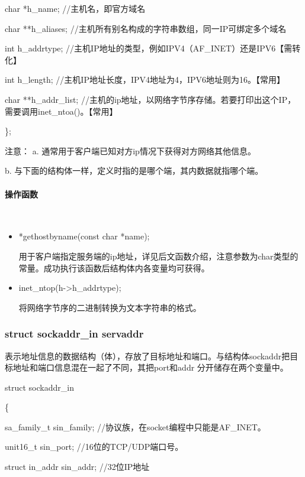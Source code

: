 \documentclass[UTF8]{article}%
\begin{document}
\qquad    char *h\_name;  //主机名，即官方域名
    
\qquad    char **h\_aliases;  //主机所有别名构成的字符串数组，同一IP可绑定多个域名

\qquad    int h\_addrtype; //主机IP地址的类型，例如IPV4（AF\_INET）还是IPV6【需转化】

\qquad    int h\_length;  //主机IP地址长度，IPV4地址为4，IPV6地址则为16。【常用】

\qquad    char **h\_addr\_list;  //主机的ip地址，以网络字节序存储。若要打印出这个IP，需要调用inet\_ntoa()。【常用】

\};

注意：
a. 通常用于客户端已知对方ip情况下获得对方网络其他信息。

b. 与下面的结构体一样，定义时指的是哪个端，其内数据就指哪个端。

\paragraph{操作函数}~{}


\begin{itemize}
    \item *gethostbyname(const char *name);
    
    用于客户端指定服务端的ip地址，详见后文函数介绍，注意参数为char类型的常量。成功执行该函数后结构体内各变量均可获得。

    \item inet\_ntop(h->h\_addrtype);
    
    将网络字节序的二进制转换为文本字符串的格式。

\end{itemize}

\subsubsection{struct sockaddr\_in servaddr}

表示地址信息的数据结构（体），存放了目标地址和端口。与结构体sockaddr把目标地址和端口信息混在一起了不同，其把port和addr 分开储存在两个变量中。

struct sockaddr\_in

\{

\qquad sa\_family\_t \quad sin\_family; //协议族，在socket编程中只能是AF\_INET。

\qquad unit16\_t \quad sin\_port; //16位的TCP/UDP端口号。

\qquad struct in\_addr \quad sin\_addr; //32位IP地址
\end{document}
